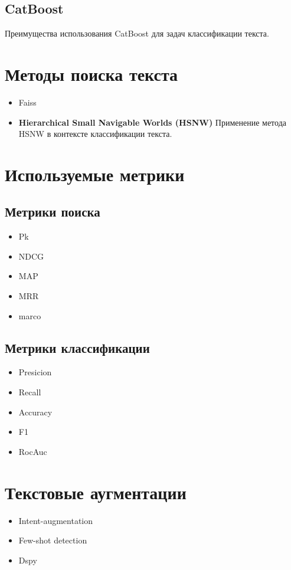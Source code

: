\documentclass[14pt,a4paper,oneside,openany]{extbook}
\begin{document}
\subsection{CatBoost}
\label{sec:orgd9cfad1}
Преимущества использования CatBoost для задач классификации текста. \autocite{dorogush_catboost_2018,prokhorenkova_catboost_2018}
\section{Методы поиска текста}
\label{sec:orgca3f212}
\begin{itemize}
\item Faiss\autocite{douze_faiss_2025}
\item \textbf{\textbf{Hierarchical Small Navigable Worlds (HSNW)}}
Применение метода HSNW в контексте классификации текста. \autocite{malkov_efficient_2018}
\end{itemize}
\section{Используемые метрики}
\label{sec:org2227366}
\subsection{Метрики поиска}
\label{sec:orgb0c5917}
\begin{itemize}
\item Pk
\item NDCG
\item MAP
\item MRR
\item marco
\end{itemize}
\subsection{Метрики классификации}
\label{sec:org5e2b661}
\begin{itemize}
\item Presicion
\item Recall
\item Accuracy
\item F1
\item RocAuc
\end{itemize}
\section{Текстовые аугментации}
\label{sec:org2e3130e}
\autocite{li_generating_2024}
\begin{itemize}
\item Intent-augmentation \autocite{hu_exploring_2024}
\item Few-shot detection \autocite{hou_fewshot_2021}
\item Dspy \autocite{khattab_dspy_2023}
\end{itemize}
\end{document}
